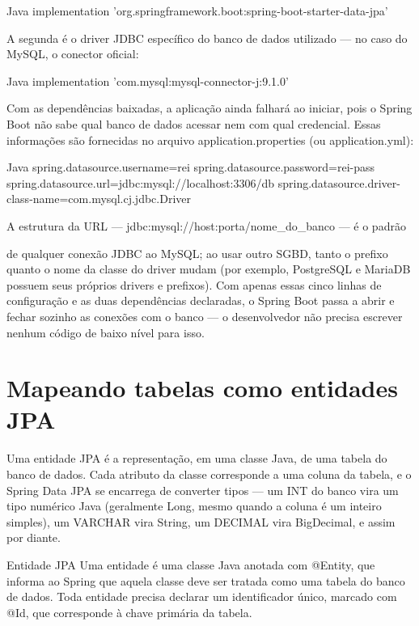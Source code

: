 \begin{codebox}{Java}
implementation 'org.springframework.boot:spring-boot-starter-data-jpa'
\end{codebox}

A segunda é o driver JDBC específico do banco de dados utilizado — no caso do MySQL, o conector oficial:

\begin{codebox}{Java}
implementation 'com.mysql:mysql-connector-j:9.1.0'
\end{codebox}

Com as dependências baixadas, a aplicação ainda falhará ao iniciar, pois o Spring Boot não sabe qual banco de dados acessar nem com qual credencial. Essas informações são fornecidas no arquivo application.properties (ou application.yml):

\begin{codebox}{Java}
spring.datasource.username=rei
spring.datasource.password=rei-pass
spring.datasource.url=jdbc:mysql://localhost:3306/db
spring.datasource.driver-class-name=com.mysql.cj.jdbc.Driver

   A estrutura da URL — jdbc:mysql://host:porta/nome_do_banco — é o padrão
\end{codebox}

de qualquer conexão JDBC ao MySQL; ao usar outro SGBD, tanto o prefixo quanto o nome da classe do driver mudam (por exemplo, PostgreSQL e MariaDB possuem seus próprios drivers e prefixos). Com apenas essas cinco linhas de configuração e as duas dependências declaradas, o Spring Boot passa a abrir e fechar sozinho as conexões com o banco — o desenvolvedor não precisa escrever nenhum código de baixo nível para isso.

\section{Mapeando tabelas como entidades JPA}

Uma entidade JPA é a representação, em uma classe Java, de uma tabela do banco de dados. Cada atributo da classe corresponde a uma coluna da tabela, e o Spring Data JPA se encarrega de converter tipos — um INT do banco vira um tipo numérico Java (geralmente Long, mesmo quando a coluna é um inteiro simples), um VARCHAR vira String, um DECIMAL vira BigDecimal, e assim por diante.

Entidade JPA Uma entidade é uma classe Java anotada com @Entity, que informa ao Spring que aquela classe deve ser tratada como uma tabela do banco de dados. Toda entidade precisa declarar um identificador único, marcado com @Id, que corresponde à chave primária da tabela.

